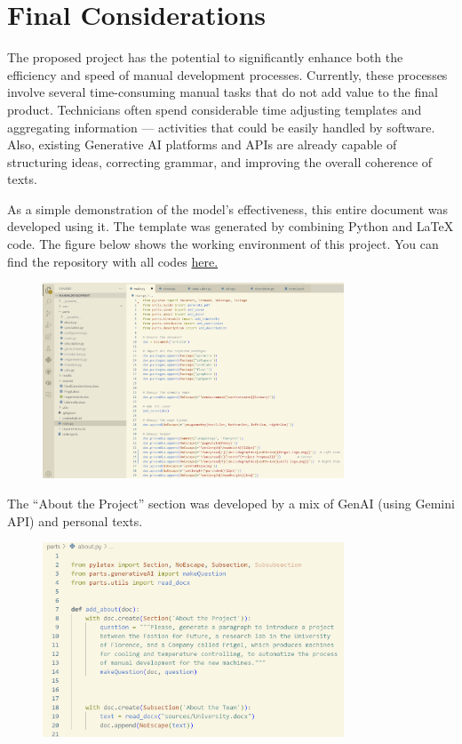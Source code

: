 \documentclass{article}%
\begin{document}
%
\newpage%
\section{Final Considerations}%
\label{sec:FinalConsiderations}%
The proposed project has the potential to significantly enhance both the efficiency and speed of manual development processes. Currently, these processes involve several time-consuming manual tasks that do not add value to the final product. Technicians often spend considerable time adjusting templates and aggregating information — activities that could be easily handled by software. Also, existing Generative AI platforms and APIs are already capable of structuring ideas, correcting grammar, and improving the overall coherence of texts.

As a simple demonstration of the model’s effectiveness, this entire document was developed using it. The template was generated by combining Python and LaTeX code. The figure below shows the working environment of this project. You can find the repository with all codes \href{ https://github.com/djonquadras/ManualDevelopment}{here.}

\begin{figure}[H]
\centering
\includegraphics[width=0.8\textwidth]{images/doc1/image1.png}
\end{figure}

The “About the Project” section was developed by a mix of GenAI (using Gemini API) and personal texts.

\begin{figure}[H]
\centering
\includegraphics[width=0.8\textwidth]{images/doc1/image2.png}
\end{figure}
\end{document}
